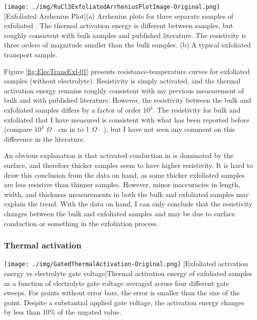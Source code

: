 \begin{centering}
\texttt{[image: ./img/RuCl3ExfoliatedArrheniusPlotImage-Original.png]}
  \captionsetup{width=0.75\textwidth}
  [Exfoliated \rucl Arrhenius Plot]{(a) Arrhenius plots for three separate samples of exfoliated \ruclnospace . The thermal activation energy is different between samples, but roughly consistent with bulk samples and published literature. The resistivity is three orders of magnitude smaller than the bulk samples. (b) A typical exfoliated \rucl transport sample.} 
  \label{fig:ElecTransExf-01}
\end{centering}

Figure \ref{fig:ElecTransExf-01} presents resistance-temperature curves for exfoliated \rucl samples (without electrolyte). Resistivity is simply activated, and the thermal activation energy remains roughly consistent with my previous measurement of bulk \rucl and with published literature. However, the resistivity between the bulk and exfoliated samples differs by a factor of order $10^3$. The resistivity for bulk and exfoliated \rucl that I have measured is consistent with what has been reported before (compare $10^3$ $\Omega \cdot$ cm in \cite{Rojas1983} to 1 $\Omega \cdot$ \cite{Mashhadi2018}), but I have not seen any comment on this difference in the literature.

An obvious explanation is that activated conduction in \rucl is dominated by the surface, and therefore thicker samples seem to have higher resistivity. It is hard to draw this conclusion from the data on hand, as some thicker exfoliated samples are less resistive than thinner samples. However, minor inaccuracies in length, width, and thickness measurements in both the bulk and exfoliated samples may explain the trend. With the data on hand, I can only conclude that the resistivity changes between the bulk and exfoliated samples and may be due to surface conduction or something in the exfoliation process.

\subsubsection{Thermal activation}

\begin{centering}
\texttt{[image: ./img/GatedThermalActivation-Original.png]}
  \captionsetup{width=0.75\textwidth}
  [Exfoliated \rucl activation energy vs electrolyte gate voltage]{Thermal activation energy of exfoliated \rucl samples as a function of electrolyte gate voltage averaged across four different gate sweeps. For points without error bars, the error is smaller than the size of the point. Despite a substantial applied gate voltage, the activation energy changes by less than 10\% of the ungated value.} 
  \label{fig:ElecTransExf-02}
\end{centering}

